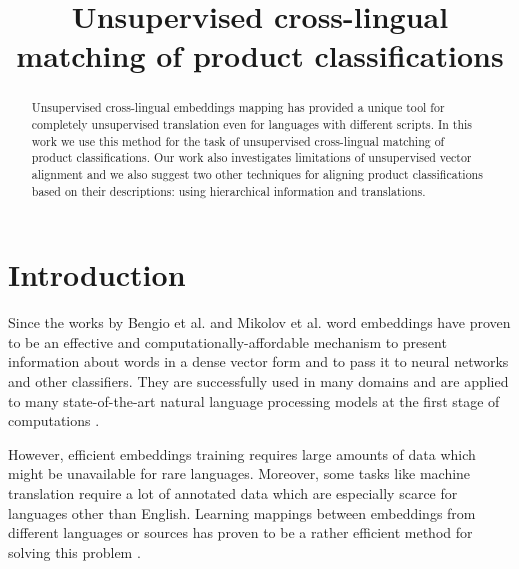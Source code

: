 \documentclass[conference]{IEEEtran}
\begin{document}
\title{Unsupervised cross-lingual matching of product classifications}
\date{}%

\author{

}

\maketitle

\begin{abstract}
Unsupervised cross-lingual embeddings mapping has provided a unique tool for completely unsupervised translation even for languages with different scripts. In this work we use this method for the task of unsupervised cross-lingual matching of product classifications. Our work also investigates limitations of unsupervised vector alignment and we also suggest two other techniques for aligning product classifications based on their descriptions: using hierarchical information and translations.
\end{abstract}

\section{Introduction}
Since the works by Bengio et al. \cite{bengio} and Mikolov et al. \cite{mikolov-representations-2013} word embeddings have proven to be an effective and computationally-affordable mechanism to present information about words in a dense vector form and to pass it to neural networks and other classifiers. They are successfully used in many domains and are applied to many state-of-the-art natural language processing models at the first stage of computations \cite{levy-goldberg-2015}.

However, efficient embeddings training requires large amounts of data which might be unavailable for rare languages. Moreover, some tasks like machine translation require a lot of annotated data which are especially scarce for languages other than English. Learning mappings between embeddings from different languages or sources has proven to be a rather efficient method for solving this problem \cite{ruder-survey}.
\end{document}
